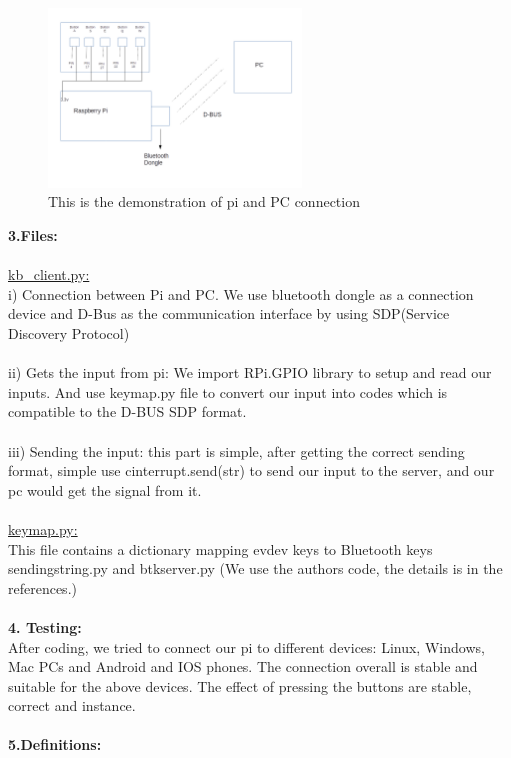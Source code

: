 \documentclass[a4paper]{article}
\begin{document}
\begin{figure}
\centering
\includegraphics[width=0.6\textwidth]{pidemo.png}
\caption{\label{fig:pi}This is the demonstration of pi and PC connection}
\end{figure}

\textbf{3.Files:} \\\\
\underline{kb\_client.py:}\\
\quad  i) Connection between Pi and PC. We use bluetooth dongle as a connection device and D-Bus as the communication interface by using SDP(Service Discovery Protocol)
\\\\
ii) Gets the input from pi: We import RPi.GPIO library to setup and read our inputs. And use keymap.py file to convert our input into codes which is compatible to the D-BUS SDP format.
\\\\
iii) Sending the input:	this part is simple, after getting the correct sending format, simple use cinterrupt.send(str) to send our input to the server, and our pc would get the signal from it.
\\\\
\underline{keymap.py:} \\This file contains a dictionary mapping evdev keys to Bluetooth keys 
sendingstring.py and btkserver.py (We use the authors code, the details is in the references.)
\\\\
\textbf{4. Testing:} \\After coding, we tried to connect our pi to different devices: Linux, Windows, Mac PCs and Android and IOS phones. The connection overall is stable and suitable for the above devices. The effect of pressing the buttons are stable, correct and instance.
\\\\
\textbf{5.Definitions:} \\\\
\end{document}
